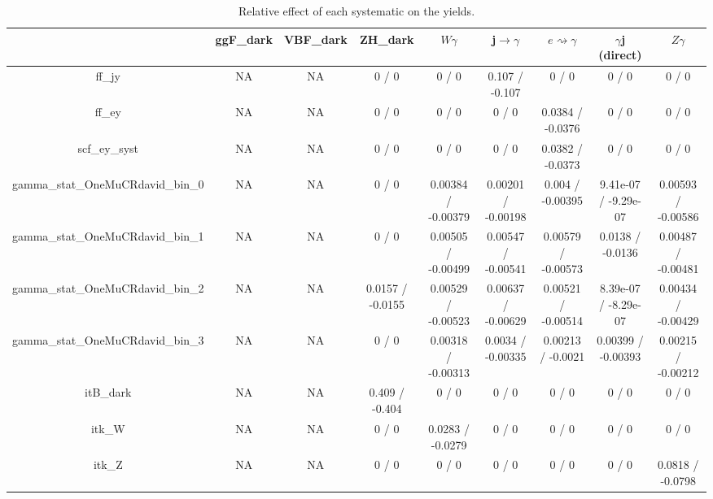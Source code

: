 \documentclass[10pt]{article}
\begin{document}
\begin{table}[htbp]
\begin{center}
\begin{tabular}{|c|c|c|c|c|c|c|c|c|}
\hline 
      & ggF_{dark}      & VBF_{dark}      & ZH_{dark}      & $W\gamma$      & j$\rightarrow\gamma$      & $e\rightsquigarrow\gamma$      & $\gamma$j (direct)      & $Z\gamma$ \\ 
\hline 
  ff_jy &    NA    &    NA    & 0 / 0 & 0 / 0 & 0.107 / -0.107 & 0 / 0 & 0 / 0 & 0 / 0 \\ 
  ff_ey &    NA    &    NA    & 0 / 0 & 0 / 0 & 0 / 0 & 0.0384 / -0.0376 & 0 / 0 & 0 / 0 \\ 
  scf_ey_syst &    NA    &    NA    & 0 / 0 & 0 / 0 & 0 / 0 & 0.0382 / -0.0373 & 0 / 0 & 0 / 0 \\ 
  gamma_stat_OneMuCRdavid_bin_0 &    NA    &    NA    & 0 / 0 & 0.00384 / -0.00379 & 0.00201 / -0.00198 & 0.004 / -0.00395 & 9.41e-07 / -9.29e-07 & 0.00593 / -0.00586 \\ 
  gamma_stat_OneMuCRdavid_bin_1 &    NA    &    NA    & 0 / 0 & 0.00505 / -0.00499 & 0.00547 / -0.00541 & 0.00579 / -0.00573 & 0.0138 / -0.0136 & 0.00487 / -0.00481 \\ 
  gamma_stat_OneMuCRdavid_bin_2 &    NA    &    NA    & 0.0157 / -0.0155 & 0.00529 / -0.00523 & 0.00637 / -0.00629 & 0.00521 / -0.00514 & 8.39e-07 / -8.29e-07 & 0.00434 / -0.00429 \\ 
  gamma_stat_OneMuCRdavid_bin_3 &    NA    &    NA    & 0 / 0 & 0.00318 / -0.00313 & 0.0034 / -0.00335 & 0.00213 / -0.0021 & 0.00399 / -0.00393 & 0.00215 / -0.00212 \\ 
  it{B}_{dark} &    NA    &    NA    & 0.409 / -0.404 & 0 / 0 & 0 / 0 & 0 / 0 & 0 / 0 & 0 / 0 \\ 
   it{k_{W}} &    NA    &    NA    & 0 / 0 & 0.0283 / -0.0279 & 0 / 0 & 0 / 0 & 0 / 0 & 0 / 0 \\ 
   it{k_{Z}} &    NA    &    NA    & 0 / 0 & 0 / 0 & 0 / 0 & 0 / 0 & 0 / 0 & 0.0818 / -0.0798 \\ 
\hline 
\end{tabular} 
\caption{Relative effect of each systematic on the yields.} 
\end{center} 
\end{table} 
\end{document}
